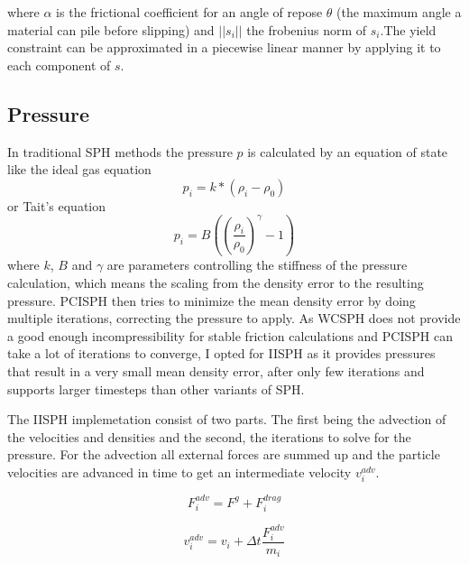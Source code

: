 \documentclass[intern]{cgMA}
\begin{document}
    where $\alpha$ is the frictional coefficient for an angle of repose $\theta$ (the maximum angle a material can pile before slipping) and $||s_i||$ the frobenius norm of $s_i$.The yield constraint can be approximated in a piecewise linear manner by applying it to each component of $s$. \cite{10.1145/2019406.2019410} \cite{10.2312:PE:vriphys:vriphys12:053-060} \cite{10.2312:LocalChapterEvents:CEIG:CEIG09:011-018} \cite{10.1145/1866158.1866195}

    \subsection{Pressure} \label{sec:pressure}
    In traditional SPH methods the pressure $p$ is calculated by an equation of state like the ideal gas equation \cite{wcsph}
    \begin{equation}
        p_i = k * (\rho_i - \rho_0)
    \end{equation}
    or Tait's equation \cite{wcsph}
    \begin{equation}
        p_i = B ((\frac{\rho_i}{\rho_0})^{\gamma} - 1)
    \end{equation}
    where $k$, $B$ and $\gamma$ are parameters controlling the stiffness of the pressure calculation, which means the scaling from the density error to the resulting pressure.
    PCISPH then tries to minimize the mean density error by doing multiple iterations, correcting the pressure to apply. As WCSPH does not provide a good enough incompressibility for stable friction calculations and PCISPH can take a lot of iterations to converge, I opted for IISPH as it provides pressures that result in a very small mean density error, after only few iterations and supports larger timesteps than other variants of SPH.

    The IISPH implemetation consist of two parts. The first being the advection of the velocities and densities and the second, the iterations to solve for the pressure. For the advection all external forces are summed up and the particle velocities are advanced in time to get an intermediate velocity $v_i^{adv}$. \cite{6570475}

    \begin{equation}
        F_i^{adv} = F^g + F_i^{drag}
    \end{equation}

    \begin{equation}
        v_i^{adv} = v_i + \Delta t \frac{F_i^{adv}}{m_i}
    \end{equation}
\end{document}
